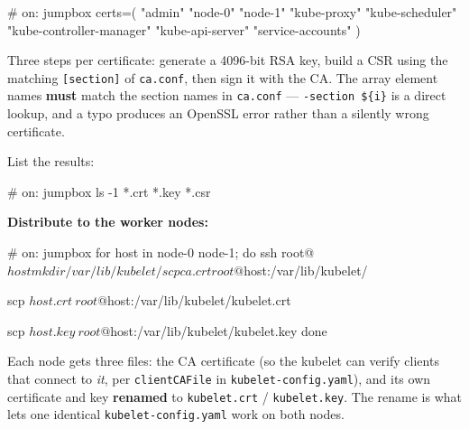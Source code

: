 \documentclass[11pt,oneside]{report}
\begin{document}
\begin{cmdlst}
# on: jumpbox
certs=(
  "admin" "node-0" "node-1"
  "kube-proxy" "kube-scheduler"
  "kube-controller-manager"
  "kube-api-server"
  "service-accounts"
)
\end{cmdlst}


Three steps per
certificate:
generate a 4096-bit
RSA key, build a CSR
using the matching
\texttt{{[}section{]}}
of \texttt{ca.conf},
then sign it with
the CA. The array
element names
\textbf{must} match
the section names in
\texttt{ca.conf} ---
\texttt{-section\ \$\{i\}}
is a direct lookup,
and a typo produces
an OpenSSL error
rather than a
silently wrong
certificate.

List the results:

\begin{cmdlst}
# on: jumpbox
ls -1 *.crt *.key *.csr
\end{cmdlst}

\textbf{Distribute
to the worker
nodes:}

\begin{cmdlst}
# on: jumpbox
for host in node-0 node-1; do
  ssh root@${host} mkdir /var/lib/kubelet/

  scp ca.crt root@${host}:/var/lib/kubelet/

  scp ${host}.crt \
    root@${host}:/var/lib/kubelet/kubelet.crt

  scp ${host}.key \
    root@${host}:/var/lib/kubelet/kubelet.key
done
\end{cmdlst}

Each node gets three
files: the CA
certificate (so the
kubelet can verify
clients that connect
to \emph{it}, per
\texttt{clientCAFile}
in
\texttt{kubelet-}\allowbreak{}\texttt{config.}\allowbreak{}\texttt{yaml}),
and its own
certificate and key
\textbf{renamed} to
\texttt{kubelet.crt}
/
\texttt{kubelet.key}.
The rename is what
lets one identical
\texttt{kubelet-}\allowbreak{}\texttt{config.}\allowbreak{}\texttt{yaml}
work on both nodes.
\end{document}
